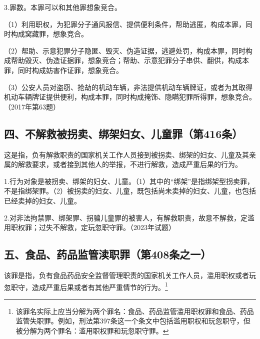 3.罪数。本罪可以和其他罪想象竞合。

（1）利用职权，为犯罪分子通风报信、提供便利条件，帮助逃匿，构成本罪，同时构成窝藏罪，想象竞合。

（2）帮助、示意犯罪分子隐匿、毁灭、伪造证据，逃避处罚，构成本罪，同时构成帮助毁灭、伪造证据罪，想象竞合；帮助、示意犯罪分子串供、翻供，构成本罪，同时构成妨害作证罪，想象竞合。

（3）公安人员对盗窃、抢劫的机动车辆，非法提供机动车辆牌证，或者为其取得机动车辆牌证提供便利，构成本罪，同时构成掩饰、隐瞒犯罪所得罪，想象竞合。（2017年第63题）

\subsection*{四、不解救被拐卖、绑架妇女、儿童罪（第416条）}

这是指，负有解救职责的国家机关工作人员接到被拐卖、绑架的妇女、儿童及其亲属的解救要求，或者接到其他人的举报，不进行解救，造成严重后果的行为。

1.行为对象是被拐卖、绑架的妇女、儿童。（1）其中的“绑架”是指绑架型拐卖罪，不是指绑架罪。（2）被拐卖的妇女、儿童，既包括尚未卖掉的妇女、儿童，也包括已经卖掉的妇女、儿童。

2.对非法拘禁罪、绑架罪、拐骗儿童罪的被害人，有解救职责，故意不解救，定滥用职权罪；过失不解救，定玩忽职守罪。（2023年试题）

\subsection*{五、食品、药品监管渎职罪（第408条之一）}

该罪是指，负有食品药品安全监督管理职责的国家机关工作人员，滥用职权或者玩忽职守，造成严重后果或者有其他严重情节的行为。\footnote{该罪名实际上应当分解为两个罪名：食品、药品监管滥用职权罪和食品、药品监管失职罪。例如，刑法第397条这一个条文中包括滥用职权和玩忽职守，但被分解为两个罪名：滥用职权罪和玩忽职守罪。}

